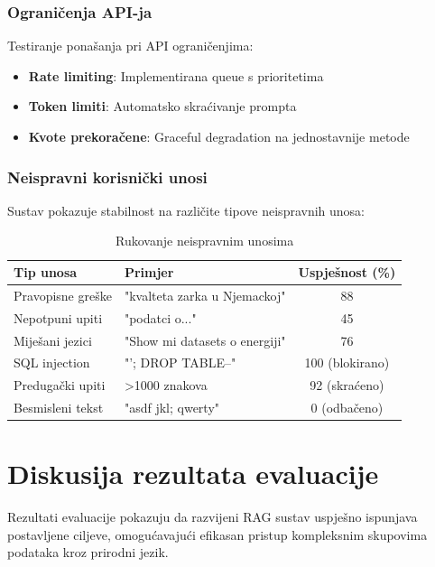 \subsubsection{Ograničenja API-ja}

Testiranje ponašanja pri API ograničenjima:

\begin{itemize}
    \item \textbf{Rate limiting}: Implementirana queue s prioritetima
    \item \textbf{Token limiti}: Automatsko skraćivanje prompta
    \item \textbf{Kvote prekoračene}: Graceful degradation na jednostavnije metode
\end{itemize}

\subsubsection{Neispravni korisnički unosi}

Sustav pokazuje stabilnost na različite tipove neispravnih unosa:

\begin{table}[htbp]
\centering
\caption{Rukovanje neispravnim unosima}
\label{tab:invalid_input_handling}
\begin{tabular}{|l|l|c|}
\hline
\textbf{Tip unosa} & \textbf{Primjer} & \textbf{Uspješnost (\%)} \\
\hline
Pravopisne greške & "kvalteta zarka u Njemackoj" & 88 \\
Nepotpuni upiti & "podatci o..." & 45 \\
Miješani jezici & "Show mi datasets o energiji" & 76 \\
SQL injection & "'; DROP TABLE--" & 100 (blokirano) \\
Predugački upiti & >1000 znakova & 92 (skraćeno) \\
Besmisleni tekst & "asdf jkl; qwerty" & 0 (odbačeno) \\
\hline
\end{tabular}
\end{table}

\section{Diskusija rezultata evaluacije}

Rezultati evaluacije pokazuju da razvijeni RAG sustav uspješno ispunjava postavljene ciljeve, omogućavajući efikasan pristup kompleksnim skupovima podataka kroz prirodni jezik.


